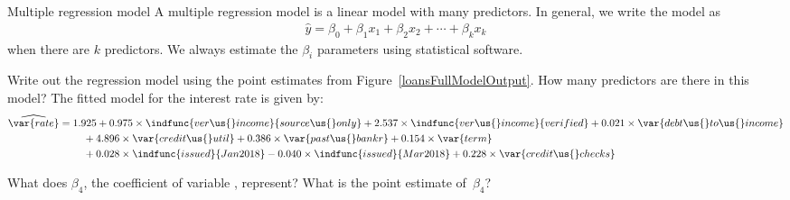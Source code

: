 \begin{onebox}{Multiple regression model}
  A multiple regression model is a linear model
  with many predictors.
  In general, we write the model as
  \begin{align*}
  \hat{y} =
      \beta_0 + \beta_1 x_1 + \beta_2 x_2 + \cdots + \beta_k x_k
  \end{align*}
  when there are $k$ predictors.
  We always estimate the $\beta_i$ parameters using
  statistical software.
\end{onebox}

\begin{examplewrap}
\begin{nexample}{Write out the regression model using
    the point estimates from
    Figure~\ref{loansFullModelOutput}.
    How many predictors are there in this model?}
  \label{loansFullModelEqWCoef}%
  The fitted model for the interest rate is given by:
  {\small\begin{align*}
  \widehat{\var{rate}}
	&= 1.925 +
	    0.975 \times \indfunc{ver\us{}income}{source\us{}only} +
	    2.537 \times \indfunc{ver\us{}income}{verified} +
		0.021 \times \var{debt\us{}to\us{}income} \\
	&\qquad\  +
	    4.896 \times \var{credit\us{}util} +
	    0.386 \times \var{past\us{}bankr} +
		0.154 \times \var{term} \\
	&\qquad\  +
	    0.028 \times \indfunc{issued}{Jan2018}
	    -0.040 \times \indfunc{issued}{Mar2018} +
		0.228 \times \var{credit\us{}checks}
  \end{align*}}
\end{nexample}
\end{examplewrap}


\begin{exercisewrap}
\begin{nexercise}
What does $\beta_4$, the coefficient of variable
, represent?
What is the point estimate of~$\beta_4$?\footnotemark
\end{nexercise}
\end{exercisewrap}

